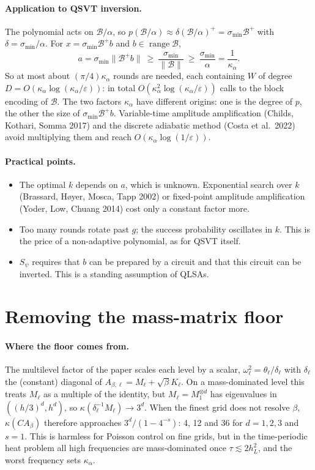 \documentclass[11pt,a4paper]{article}
\newcommand{\B}{\mathcal{B}}
\begin{document}
\paragraph{Application to QSVT inversion.} The polynomial acts on $\B/\alpha$, so
$p(\B/\alpha)\approx\delta(\B/\alpha)^+=\sigma_{\min}\B^+$ with $\delta=\sigma_{\min}/\alpha$. For
$x=\sigma_{\min}\B^+b$ and $b\in\operatorname{range}\B$,
\[
a=\sigma_{\min}\|\B^+b\|\ \ge\ \frac{\sigma_{\min}}{\|\B\|}\ \ge\ \frac{\sigma_{\min}}{\alpha}=\frac1{\kappa_\alpha}.
\]
So at most about $(\pi/4)\kappa_\alpha$ rounds are needed, each containing $W$ of
degree $D=O(\kappa_\alpha\log(\kappa_\alpha/\varepsilon))$: in total
$O(\kappa_\alpha^2\log(\kappa_\alpha/\varepsilon))$ calls to the block encoding of $\B$. The two
factors $\kappa_\alpha$ have different origins: one is the degree of $p$, the other
the size of $\sigma_{\min}\B^+b$. Variable-time amplitude amplification (Childs,
Kothari, Somma 2017) and the discrete adiabatic method (Costa et al.\ 2022)
avoid multiplying them and reach $O(\kappa_\alpha\log(1/\varepsilon))$.

\paragraph{Practical points.}
\begin{itemize}
\item The optimal $k$ depends on $a$, which is unknown. Exponential search
  over $k$ (Brassard, H{\o}yer, Mosca, Tapp 2002) or fixed-point amplitude
  amplification (Yoder, Low, Chuang 2014) cost only a constant factor more.
\item Too many rounds rotate past $g$; the success probability oscillates
  in $k$. This is the price of a non-adaptive polynomial, as for QSVT itself.
\item $S_\psi$ requires that $b$ can be prepared by a circuit and that this
  circuit can be inverted. This is a standing assumption of QLSAs.
\end{itemize}

\section{Removing the mass-matrix floor}\label{sec:floor}

\paragraph{Where the floor comes from.} The multilevel factor of the paper
scales each level by a scalar, $\omega_\ell^2=\theta_\ell/\delta_\ell$ with $\delta_\ell$ the (constant)
diagonal of $A_{\beta,\ell}=M_\ell+\sqrt\beta K_\ell$. On a mass-dominated level this treats
$M_\ell$ as a multiple of the identity, but $M_\ell=M_1^{\otimes d}$ has eigenvalues in
$((h/3)^d,h^d)$, so $\kappa(\delta_\ell^{-1}M_\ell)\to3^d$. When the finest grid does not resolve
$\beta$, $\kappa(CA_\beta)$ therefore approaches $3^d/(1-4^{-s})$: 4, 12 and 36 for $d=1,2,3$
and $s=1$. This is harmless for Poisson control on fine grids, but in the
time-periodic heat problem all high frequencies are mass-dominated once
$\tau\lesssim2h_L^2$, and the worst frequency sets $\kappa_\alpha$.
\end{document}
